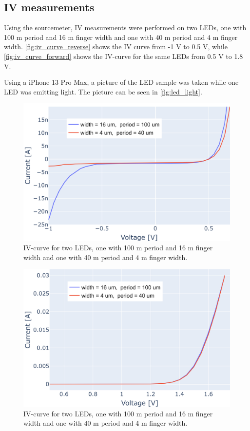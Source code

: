 \subsection{IV measurements}

Using the sourcemeter, IV measurements were performed on two LEDs, one with 100 \textmu m period and 16 \textmu m finger width and one with 40 \textmu m period and 4 \textmu m finger width.
\autoref{fig:iv_curve_reverse} shows the IV curve from -1 V to 0.5 V, while \autoref{fig:iv_curve_forward} shows the IV-curve for the same LEDs from 0.5 V to 1.8 V.

Using a iPhone 13 Pro Max, a picture of the LED sample was taken while one LED was emitting light.
The picture can be seen in \autoref{fig:led_light}.


\begin{figure}
    \centering
    \includegraphics[width=\linewidth]{figures/LED_IV-curve_reverse.png}
    \caption{IV-curve for two LEDs, one with 100 \textmu m period and 16 \textmu m finger width and one with 40 \textmu m period and 4 \textmu m finger width.}
    \label{fig:iv_curve_reverse}
\end{figure}


\begin{figure}
    \centering
    \includegraphics[width=\linewidth]{figures/LED_IV-curve_forward.png}
    \caption{IV-curve for two LEDs, one with 100 \textmu m period and 16 \textmu m finger width and one with 40 \textmu m period and 4 \textmu m finger width.}
    \label{fig:iv_curve_forward}
\end{figure}

